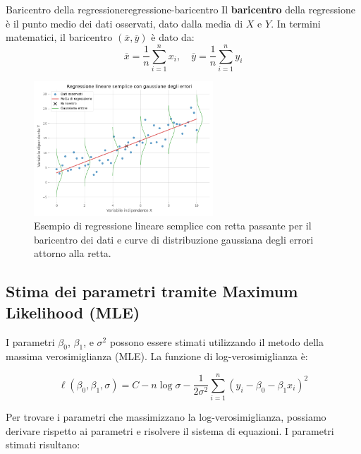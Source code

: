 \begin{nota}{Baricentro della regressione}{regressione-baricentro}
Il \textbf{baricentro} della regressione è il punto medio dei dati osservati, dato dalla media di \( X \) e \( Y \). In termini matematici, il baricentro \( (\overline{x}, \overline{y}) \) è dato da:
\[
\overline{x} = \frac{1}{n} \sum_{i=1}^n x_i, \quad \overline{y} = \frac{1}{n} \sum_{i=1}^n y_i
\]
\end{nota}

\begin{figure}[H]
    \centering
    \includegraphics[width=0.6\textwidth]{images/th_16_18/regressione_lineare_semplice2.png}
    \caption{Esempio di regressione lineare semplice con retta passante per il baricentro dei dati e curve di distribuzione gaussiana degli errori attorno alla retta.}
    \label{fig:regressione_lineare_semplice_gaussianine_e_baricentro}
\end{figure}

\subsection{Stima dei parametri tramite Maximum Likelihood (MLE)}

I parametri \( \beta_0 \), \( \beta_1 \), e \( \sigma^2 \) possono essere stimati utilizzando il metodo della massima verosimiglianza (MLE). La funzione di log-verosimiglianza è:

\[
\ell(\beta_0, \beta_1, \sigma) = C - n \log \sigma - \frac{1}{2\sigma^2} \sum_{i=1}^n (y_i - \beta_0 - \beta_1 x_i)^2
\]

Per trovare i parametri che massimizzano la log-verosimiglianza, possiamo derivare rispetto ai parametri e risolvere il sistema di equazioni. I parametri stimati risultano:

